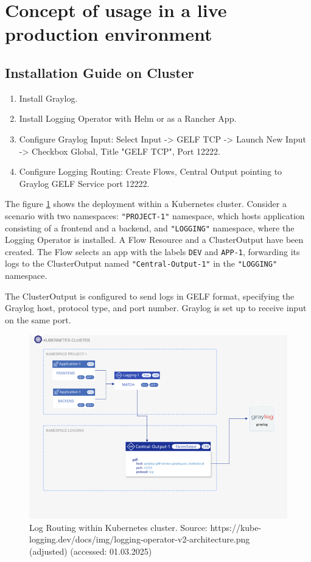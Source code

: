 \documentclass[../main.tex]{subfiles}
\begin{document}
\clearpage
\section{Concept of usage in a live production environment}

\subsection{Installation Guide on Cluster}

\begin{enumerate}
    \item Install Graylog.
    \item Install Logging Operator with Helm or as a Rancher App.
    \item Configure Graylog Input: 
    Select Input -> GELF TCP -> Launch New Input -> Checkbox Global, Title "GELF TCP", Port 12222.
    \item Configure Logging Routing: Create Flows, Central Output pointing to Graylog GELF Service port 12222.
\end{enumerate}

The figure \ref{fig:flows_output} shows the deployment within a Kubernetes cluster. Consider a scenario with two namespaces: \texttt{"PROJECT-1"} namespace, which hosts application consisting of a frontend and a backend, and \texttt{"LOGGING"} namespace, where the Logging Operator is installed. A Flow Resource and a ClusterOutput have been created. The Flow selects an app with the labels \texttt{DEV} and \texttt{APP-1}, forwarding its logs to the ClusterOutput named \texttt{"Central-Output-1"} in the \texttt{"LOGGING"} namespace.  

The ClusterOutput is configured to send logs in GELF format, specifying the Graylog host, protocol type, and port number. Graylog is set up to receive input on the same port.

\begin{figure}[h]
        \centering
        \includegraphics[scale=0.9]{img/2-background/centralized_logging/flows_output.png}
        \caption{Log Routing within Kubernetes cluster. Source: https://kube-logging.dev/docs/img/logging-operator-v2-architecture.png (adjusted) (accessed: 01.03.2025) }
        \label{fig:flows_output}
\end{figure}
\end{document}
